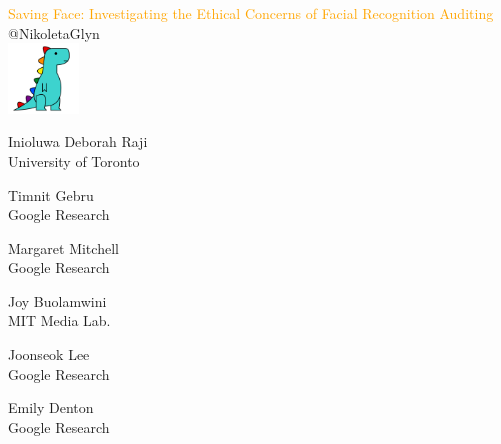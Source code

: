 \documentclass{beamer}
\begin{document}
\begin{frame}
    \begin{center}
        \Large{\textcolor{orange}{Saving Face: Investigating the Ethical Concerns of Facial Recognition Auditing}} \\
    
        \vspace{1cm}
        \normalsize{@NikoletaGlyn} \\
        \vspace{.5cm}
        \includegraphics[width=0.14\textwidth]{static/dyno.png}

    \end{center}
\end{frame}

\begin{frame}
    \centering
    \footnotesize{
    \begin{minipage}[t]{0.3\textwidth}
        \centering
        Inioluwa Deborah Raji \\
        University of Toronto
    \end{minipage}
    \begin{minipage}[t]{0.3\textwidth}
        \centering
        Timnit Gebru \\
        Google Research
    \end{minipage}
    \begin{minipage}[t]{0.3\textwidth}
        \centering
        Margaret Mitchell \\
        Google Research
    \end{minipage}}
    \vfill

    \footnotesize{
    \begin{minipage}[t]{0.3\textwidth}
        \centering
        Joy Buolamwini \\
        MIT Media Lab.
    \end{minipage}
    \begin{minipage}[t]{0.3\textwidth}
        \centering
        Joonseok Lee \\
        Google Research
    \end{minipage}
    \begin{minipage}[t]{0.3\textwidth}
        \centering
        Emily Denton \\
        Google Research
    \end{minipage}}
\end{frame}
\end{document}
